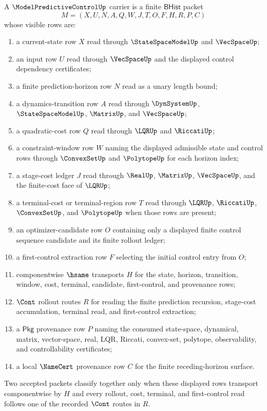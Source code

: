 \begin{definition}
\label{def:modelpredictivecontrol-bhist-carrier}
A $\ModelPredictiveControlUp$ carrier is a finite $\mathsf{BHist}$ packet
$$
M=(X,U,N,A,Q,W,J,T,O,F,H,R,P,C)
$$
whose visible rows are:
\begin{enumerate}
\item a current-state row $X$ read through $\StateSpaceModelUp$ and
$\VecSpaceUp$;
\item an input row $U$ read through $\VecSpaceUp$ and the displayed control
dependency certificates;
\item a finite prediction-horizon row $N$ read as a unary length bound;
\item a dynamics-transition row $A$ read through $\DynSystemUp$,
$\StateSpaceModelUp$, $\MatrixUp$, and $\VecSpaceUp$;
\item a quadratic-cost row $Q$ read through $\LQRUp$ and $\RiccatiUp$;
\item a constraint-window row $W$ naming the displayed admissible state and
control rows through $\ConvexSetUp$ and $\PolytopeUp$ for each horizon index;
\item a stage-cost ledger $J$ read through $\RealUp$, $\MatrixUp$,
$\VecSpaceUp$, and the finite-cost face of $\LQRUp$;
\item a terminal-cost or terminal-region row $T$ read through $\LQRUp$,
$\RiccatiUp$, $\ConvexSetUp$, and $\PolytopeUp$ when those rows are present;
\item an optimizer-candidate row $O$ containing only a displayed finite control
sequence candidate and its finite rollout ledger;
\item a first-control extraction row $F$ selecting the initial control entry
from $O$;
\item componentwise $\hsame$ transports $H$ for the state, horizon,
transition, window, cost, terminal, candidate, first-control, and provenance
rows;
\item $\Cont$ rollout routes $R$ for reading the finite prediction recursion,
stage-cost accumulation, terminal read, and first-control extraction;
\item a $\mathsf{Pkg}$ provenance row $P$ naming the consumed state-space,
dynamical, matrix, vector-space, real, LQR, Riccati, convex-set, polytope,
observability, and controllability certificates;
\item a local $\NameCert$ provenance row $C$ for the finite receding-horizon
surface.
\end{enumerate}
Two accepted packets classify together only when these displayed rows
transport componentwise by $H$ and every rollout, cost, terminal, and
first-control read follows one of the recorded $\Cont$ routes in $R$.
\end{definition}


